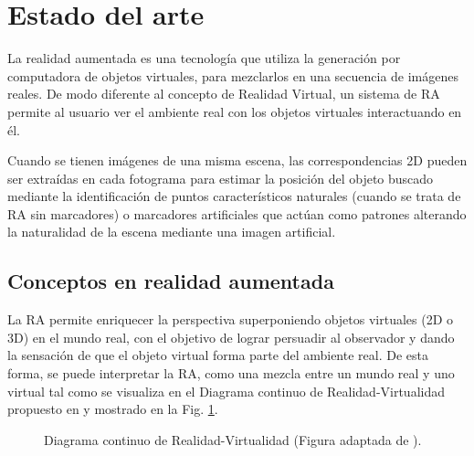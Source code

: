 \section{Estado del arte}
% 
La realidad aumentada es una tecnología que utiliza la generación por computadora de objetos virtuales, para mezclarlos en una secuencia de imágenes reales. De modo diferente al concepto de Realidad Virtual, un sistema de RA permite al usuario ver el ambiente real con los objetos virtuales interactuando en él.
% 

Cuando se tienen imágenes de una misma escena, las correspondencias 2D pueden ser extraídas en cada fotograma para estimar la posición del objeto buscado mediante la identificación de puntos característicos naturales (cuando se trata de RA sin marcadores) o marcadores artificiales que actúan como patrones alterando la naturalidad de la escena mediante una imagen artificial.
\subsection{Conceptos en realidad aumentada}
La RA permite enriquecer la perspectiva superponiendo objetos virtuales (2D o 3D) en el mundo real, con el objetivo de lograr persuadir al 
observador y dando la sensación de que el objeto virtual forma parte del ambiente real. De esta forma, se puede interpretar
la RA, como una mezcla entre un mundo real y uno virtual tal como se visualiza en el Diagrama continuo de Realidad-Virtualidad propuesto en \cite{Milgram94augmentedreality} y mostrado en la Fig. \ref{fig:Reality-Virtuality Continuum}.
\begin{figure}[tbp]
\centering
{}
\caption[Diagrama continuo de Realidad-Virtualidad]{Diagrama continuo de Realidad-Virtualidad (Figura adaptada de \cite{Milgram94augmentedreality}).}
\label{fig:Reality-Virtuality Continuum}
\end{figure}


